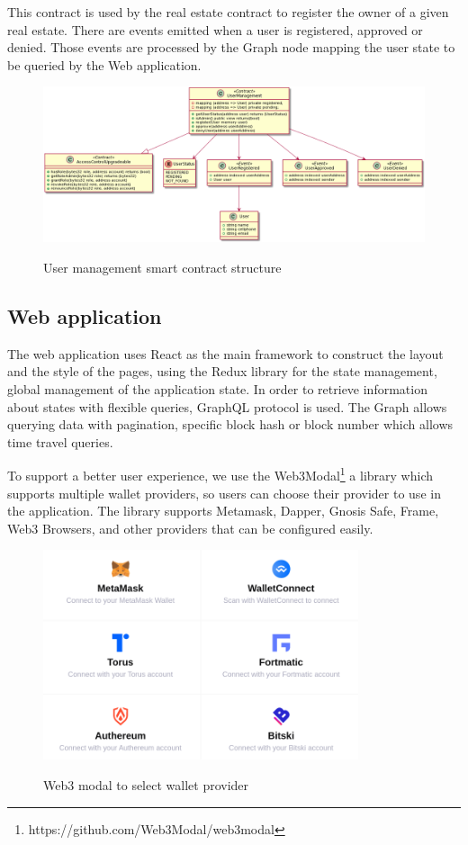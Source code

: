 \documentclass[
    article, 
    12pt,				%
	oneside,			%
	a4paper,			%
	chapter=TITLE,		%
	section=TITLE,		%
	english,			%
	english,				%
	sumario=tradicional
]{abntex2}
\begin{document}
This contract is used by the real estate contract to register the owner of a given real estate.
There are events emitted when a user is registered, approved or denied.
Those events are processed by the Graph node mapping the user state to be queried by the Web application.

\begin{figure}[ht]
    \centering
    \caption{User management smart contract structure}
    \includegraphics[width=\textwidth]{images/uml/user_management.png}
    \label{fig:user_management_uml}
\end{figure}


\subsection{Web application}

The web application uses React as the main framework to construct the layout and the style of the pages, using the Redux library for the state management, global management of the application state.
In order to retrieve information about states with flexible queries, GraphQL protocol is used.
The Graph allows querying data with pagination, specific block hash or block number which allows time travel queries.

To support a better user experience, we use the Web3Modal\footnote{https://github.com/Web3Modal/web3modal} a library which supports multiple wallet providers, so users can choose their provider to use in the application.
The library supports Metamask, Dapper, Gnosis Safe, Frame, Web3 Browsers, and other providers that can be configured easily.

\begin{figure}[ht]
    \centering
    \caption{Web3 modal to select wallet provider}
    \includegraphics[width=350px]{images/web3_modal.png}
    \label{fig:web3_modal}
\end{figure}
\end{document}
